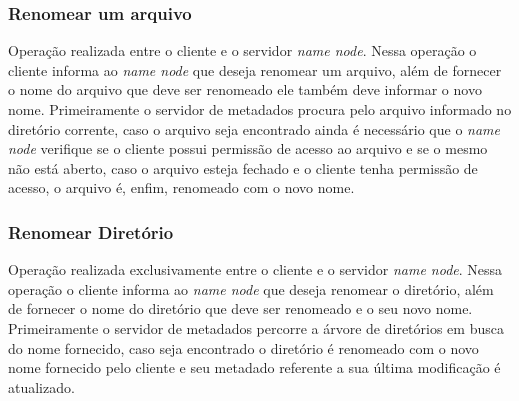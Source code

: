 \subsubsection{Renomear um arquivo}
Operação realizada entre o cliente e o servidor \textit{name node}. Nessa operação o cliente informa ao \textit{name node} que deseja renomear um arquivo, além de fornecer o nome do arquivo que deve ser renomeado ele também deve informar o novo nome. Primeiramente o servidor de metadados procura pelo arquivo informado no diretório corrente, caso o arquivo seja encontrado ainda é necessário que o \textit{name node} verifique se o cliente possui permissão de acesso ao arquivo e se o mesmo não está aberto, caso o arquivo esteja fechado e o cliente tenha permissão de acesso, o arquivo é, enfim, renomeado com o novo nome.
\\

\subsubsection{Renomear Diretório}

Operação realizada exclusivamente entre o cliente e o servidor \textit{name node}. Nessa operação o cliente informa ao \textit{name node} que deseja renomear o diretório, além de fornecer o nome do diretório que deve ser renomeado e o seu novo nome. Primeiramente o servidor de metadados percorre a árvore de diretórios em busca do nome fornecido, caso seja encontrado o diretório é renomeado com o novo nome fornecido pelo cliente e seu metadado referente a sua última modificação é atualizado.
\\




